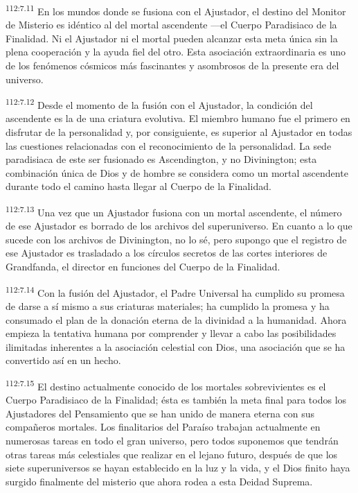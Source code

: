 \par
\textsuperscript{112:7.11} En los mundos donde se fusiona con el Ajustador, el destino del Monitor de Misterio es idéntico al del mortal ascendente ---el Cuerpo Paradisiaco de la Finalidad. Ni el Ajustador ni el mortal pueden alcanzar esta meta única sin la plena cooperación y la ayuda fiel del otro. Esta asociación extraordinaria es uno de los fenómenos cósmicos más fascinantes y asombrosos de la presente era del universo.

\par
\textsuperscript{112:7.12} Desde el momento de la fusión con el Ajustador, la condición del ascendente es la de una criatura evolutiva. El miembro humano fue el primero en disfrutar de la personalidad y, por consiguiente, es superior al Ajustador en todas las cuestiones relacionadas con el reconocimiento de la personalidad. La sede paradisiaca de este ser fusionado es Ascendington, y no Divinington; esta combinación única de Dios y de hombre se considera como un mortal ascendente durante todo el camino hasta llegar al Cuerpo de la Finalidad.

\par
\textsuperscript{112:7.13} Una vez que un Ajustador fusiona con un mortal ascendente, el número de ese Ajustador es borrado de los archivos del superuniverso. En cuanto a lo que sucede con los archivos de Divinington, no lo sé, pero supongo que el registro de ese Ajustador es trasladado a los círculos secretos de las cortes interiores de Grandfanda, el director en funciones del Cuerpo de la Finalidad.

\par
\textsuperscript{112:7.14} Con la fusión del Ajustador, el Padre Universal ha cumplido su promesa de darse a sí mismo a sus criaturas materiales; ha cumplido la promesa y ha consumado el plan de la donación eterna de la divinidad a la humanidad. Ahora empieza la tentativa humana por comprender y llevar a cabo las posibilidades ilimitadas inherentes a la asociación celestial con Dios, una asociación que se ha convertido así en un hecho.

\par
\textsuperscript{112:7.15} El destino actualmente conocido de los mortales sobrevivientes es el Cuerpo Paradisiaco de la Finalidad; ésta es también la meta final para todos los Ajustadores del Pensamiento que se han unido de manera eterna con sus compañeros mortales. Los finalitarios del Paraíso trabajan actualmente en numerosas tareas en todo el gran universo, pero todos suponemos que tendrán otras tareas más celestiales que realizar en el lejano futuro, después de que los siete superuniversos se hayan establecido en la luz y la vida, y el Dios finito haya surgido finalmente del misterio que ahora rodea a esta Deidad Suprema.


